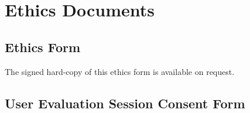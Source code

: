 \chapter{Ethics Documents}

\label{AppendixEthics}

\section{Ethics Form} \label{AppendixEthicsForm}

The signed hard-copy of this ethics form is available on request.



\section{User Evaluation Session Consent Form} \label{AppendixConsentForm}

